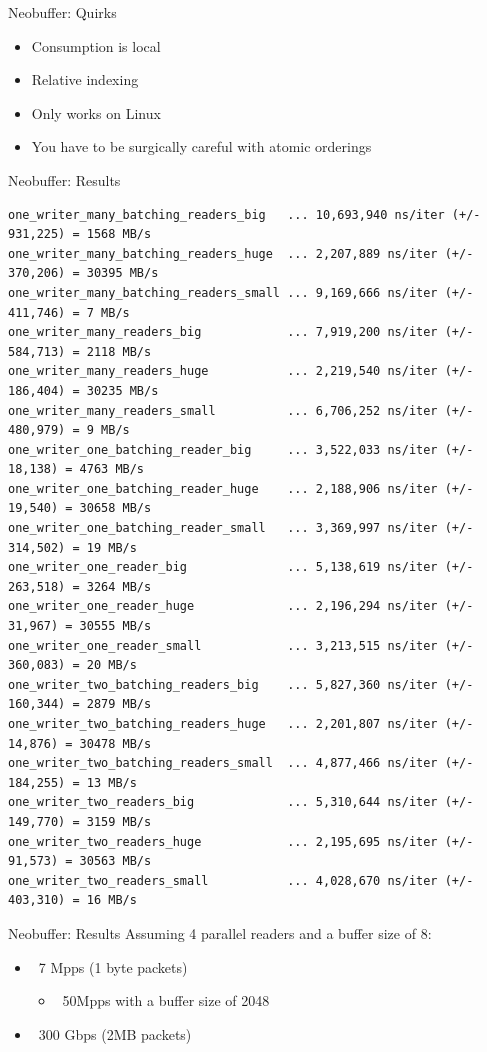 \documentclass[aspectratio=43]{beamer}
\begin{document}
\begin{frame}{Neobuffer: Quirks}
    \begin{itemize}
        \item<1-> Consumption is local
        \item<2-> Relative indexing
        \item<3-> Only works on Linux
        \item<4-> You have to be surgically careful with atomic orderings
    \end{itemize}
\end{frame}

\begin{frame}[fragile]{Neobuffer: Results}
    \begin{verbatim}
one_writer_many_batching_readers_big   ... 10,693,940 ns/iter (+/- 931,225) = 1568 MB/s
one_writer_many_batching_readers_huge  ... 2,207,889 ns/iter (+/- 370,206) = 30395 MB/s
one_writer_many_batching_readers_small ... 9,169,666 ns/iter (+/- 411,746) = 7 MB/s
one_writer_many_readers_big            ... 7,919,200 ns/iter (+/- 584,713) = 2118 MB/s
one_writer_many_readers_huge           ... 2,219,540 ns/iter (+/- 186,404) = 30235 MB/s
one_writer_many_readers_small          ... 6,706,252 ns/iter (+/- 480,979) = 9 MB/s
one_writer_one_batching_reader_big     ... 3,522,033 ns/iter (+/- 18,138) = 4763 MB/s
one_writer_one_batching_reader_huge    ... 2,188,906 ns/iter (+/- 19,540) = 30658 MB/s
one_writer_one_batching_reader_small   ... 3,369,997 ns/iter (+/- 314,502) = 19 MB/s
one_writer_one_reader_big              ... 5,138,619 ns/iter (+/- 263,518) = 3264 MB/s
one_writer_one_reader_huge             ... 2,196,294 ns/iter (+/- 31,967) = 30555 MB/s
one_writer_one_reader_small            ... 3,213,515 ns/iter (+/- 360,083) = 20 MB/s
one_writer_two_batching_readers_big    ... 5,827,360 ns/iter (+/- 160,344) = 2879 MB/s
one_writer_two_batching_readers_huge   ... 2,201,807 ns/iter (+/- 14,876) = 30478 MB/s
one_writer_two_batching_readers_small  ... 4,877,466 ns/iter (+/- 184,255) = 13 MB/s
one_writer_two_readers_big             ... 5,310,644 ns/iter (+/- 149,770) = 3159 MB/s
one_writer_two_readers_huge            ... 2,195,695 ns/iter (+/- 91,573) = 30563 MB/s
one_writer_two_readers_small           ... 4,028,670 ns/iter (+/- 403,310) = 16 MB/s
    \end{verbatim}
\end{frame}

\begin{frame}{Neobuffer: Results}
    Assuming 4 parallel readers and a buffer size of 8:
    \begin{itemize}
        \item<1-> ~7 Mpps (1 byte packets)
            \begin{itemize}
                \item ~50Mpps with a buffer size of 2048
            \end{itemize}
        \item<2-> ~300 Gbps (2MB packets)
    \end{itemize}
\end{frame}
\end{document}
